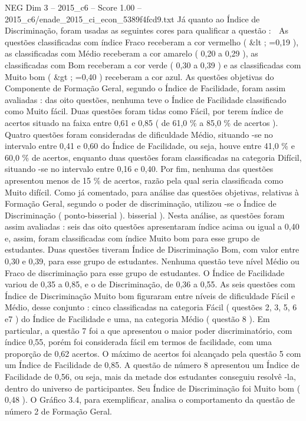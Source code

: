 \begin{textsample}{NEG Dim 3 – 2015\_c6 – Score 1.00 – 2015\_c6/enade\_2015\_ci\_econ\_5389f4fcd9.txt}
Já quanto ao Índice de Discriminação, foram usadas as seguintes cores para qualificar a questão :  As questões classificadas com índice Fraco receberam a cor vermelho ( \&lt ; =0,19 ), as classificadas com Médio receberam a cor amarelo ( 0,20 a 0,29 ), as classificadas com Bom receberam a cor verde ( 0,30 a 0,39 ) e as classificadas com Muito bom ( \&gt ; =0,40 ) receberam a cor azul.
As questões objetivas do Componente de Formação Geral, segundo o Índice de Facilidade, foram assim avaliadas : das oito questões, nenhuma teve o Índice de Facilidade classificado como Muito fácil.
Duas questões foram tidas como Fácil, por terem índice de acertos situado na faixa entre 0,61 e 0,85 ( de 61,0 \% a 85,0 \% de acertos ).
Quatro questões foram consideradas de dificuldade Médio, situando -se no intervalo entre 0,41 e 0,60 do Índice de Facilidade, ou seja, houve entre 41,0 \% e 60,0 \% de acertos, enquanto duas questões foram classificadas na categoria Difícil, situando -se no intervalo entre 0,16 e 0,40.
Por fim, nenhuma das questões apresentou menos de 15 \% de acertos, razão pela qual seria classificada como Muito difícil.
Como já comentado, para análise das questões objetivas, relativas à Formação Geral, segundo o poder de discriminação, utilizou -se o Índice de Discriminação ( ponto-bisserial ). bisserial ).
Nesta análise, as questões foram assim avaliadas : seis das oito questões apresentaram índice acima ou igual a 0,40 e, assim, foram classificadas com índice Muito bom para esse grupo de estudantes.
Duas questões tiveram Índice de Discriminação Bom, com valor entre 0,30 e 0,39, para esse grupo de estudantes.
Nenhuma questão teve nível Médio ou Fraco de discriminação para esse grupo de estudantes.
O Índice de Facilidade variou de 0,35 a 0,85, e o de Discriminação, de 0,36 a 0,55.
As seis questões com Índice de Discriminação Muito bom figuraram entre níveis de dificuldade Fácil e Médio, desse conjunto : cinco classificadas na categoria Fácil ( questões 2, 3, 5, 6 e7 ) do Índice de Facilidade e uma, na categoria Médio ( questão 8 ).
Em particular, a questão 7 foi a que apresentou o maior poder discriminatório, com índice 0,55, porém foi considerada fácil em termos de facilidade, com uma proporção de 0,62 acertos.
O máximo de acertos foi alcançado pela questão 5 com um Índice de Facilidade de 0,85.
A questão de número 8 apresentou um Índice de Facilidade de 0,56, ou seja, mais da metade dos estudantes conseguiu resolvê -la, dentro do universo de participantes.
Seu Índice de Discriminação foi Muito bom ( 0,48 ).
O Gráfico 3.4, para exemplificar, analisa o comportamento da questão de número 2 de Formação Geral.

\end{textsample}
